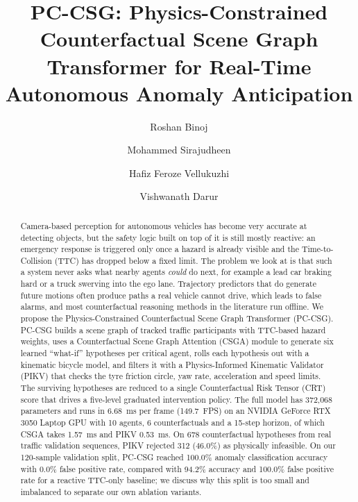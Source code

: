 \documentclass[preprint,12pt]{elsarticle}
\begin{document}
\begin{frontmatter}

\title{PC-CSG: Physics-Constrained Counterfactual Scene Graph Transformer for Real-Time Autonomous Anomaly Anticipation}

\author[1]{Roshan Binoj}
\author[1]{Mohammed Sirajudheen}
\author[1]{Hafiz Feroze Vellukuzhi}
\author[1]{Vishwanath Darur}

\address[1]{Department of Computer Science and Engineering, Indian Institute of Information Technology Kottayam, Kerala 686635, India}

\begin{abstract}
Camera-based perception for autonomous vehicles has become very accurate at detecting objects, but the safety logic built on top of it is still mostly reactive: an emergency response is triggered only once a hazard is already visible and the Time-to-Collision (TTC) has dropped below a fixed limit.
The problem we look at is that such a system never asks what nearby agents \emph{could} do next, for example a lead car braking hard or a truck swerving into the ego lane. Trajectory predictors that do generate future motions often produce paths a real vehicle cannot drive, which leads to false alarms, and most counterfactual reasoning methods in the literature run offline.
We propose the Physics-Constrained Counterfactual Scene Graph Transformer (PC-CSG). PC-CSG builds a scene graph of tracked traffic participants with TTC-based hazard weights, uses a Counterfactual Scene Graph Attention (CSGA) module to generate six learned ``what-if'' hypotheses per critical agent, rolls each hypothesis out with a kinematic bicycle model, and filters it with a Physics-Informed Kinematic Validator (PIKV) that checks the tyre friction circle, yaw rate, acceleration and speed limits. The surviving hypotheses are reduced to a single Counterfactual Risk Tensor (CRT) score that drives a five-level graduated intervention policy.
The full model has 372,068 parameters and runs in 6.68~ms per frame (149.7~FPS) on an NVIDIA GeForce RTX 3050 Laptop GPU with 10 agents, 6 counterfactuals and a 15-step horizon, of which CSGA takes 1.57~ms and PIKV 0.53~ms. On 678 counterfactual hypotheses from real traffic validation sequences, PIKV rejected 312 (46.0\%) as physically infeasible. On our 120-sample validation split, PC-CSG reached 100.0\% anomaly classification accuracy with 0.0\% false positive rate, compared with 94.2\% accuracy and 100.0\% false positive rate for a reactive TTC-only baseline; we discuss why this split is too small and imbalanced to separate our own ablation variants.
\end{abstract}


\end{frontmatter}
\end{document}
